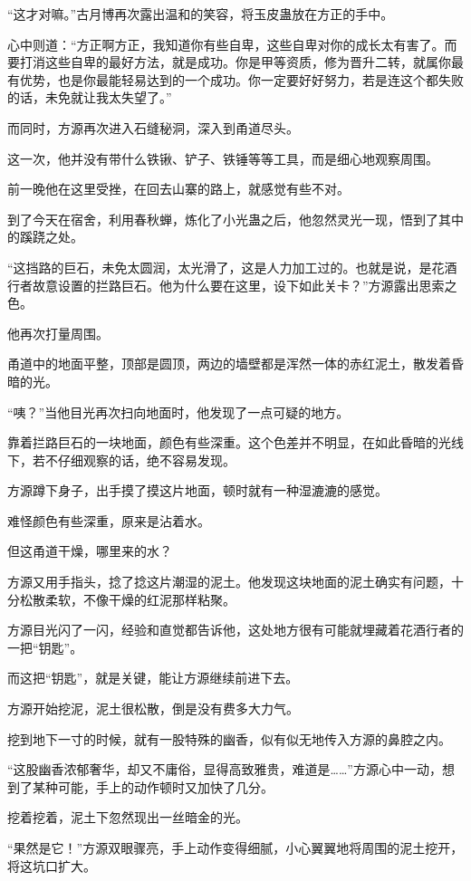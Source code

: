 \begin{this_body}
“这才对嘛。”古月博再次露出温和的笑容，将玉皮蛊放在方正的手中。

心中则道：“方正啊方正，我知道你有些自卑，这些自卑对你的成长太有害了。而要打消这些自卑的最好方法，就是成功。你是甲等资质，修为晋升二转，就属你最有优势，也是你最能轻易达到的一个成功。你一定要好好努力，若是连这个都失败的话，未免就让我太失望了。”

而同时，方源再次进入石缝秘洞，深入到甬道尽头。

这一次，他并没有带什么铁锹、铲子、铁锤等等工具，而是细心地观察周围。

前一晚他在这里受挫，在回去山寨的路上，就感觉有些不对。

到了今天在宿舍，利用春秋蝉，炼化了小光蛊之后，他忽然灵光一现，悟到了其中的蹊跷之处。

“这挡路的巨石，未免太圆润，太光滑了，这是人力加工过的。也就是说，是花酒行者故意设置的拦路巨石。他为什么要在这里，设下如此关卡？”方源露出思索之色。

他再次打量周围。

甬道中的地面平整，顶部是圆顶，两边的墙壁都是浑然一体的赤红泥土，散发着昏暗的光。

“咦？”当他目光再次扫向地面时，他发现了一点可疑的地方。

靠着拦路巨石的一块地面，颜色有些深重。这个色差并不明显，在如此昏暗的光线下，若不仔细观察的话，绝不容易发现。

方源蹲下身子，出手摸了摸这片地面，顿时就有一种湿漉漉的感觉。

难怪颜色有些深重，原来是沾着水。

但这甬道干燥，哪里来的水？

方源又用手指头，捻了捻这片潮湿的泥土。他发现这块地面的泥土确实有问题，十分松散柔软，不像干燥的红泥那样粘聚。

方源目光闪了一闪，经验和直觉都告诉他，这处地方很有可能就埋藏着花酒行者的一把“钥匙”。

而这把“钥匙”，就是关键，能让方源继续前进下去。

方源开始挖泥，泥土很松散，倒是没有费多大力气。

挖到地下一寸的时候，就有一股特殊的幽香，似有似无地传入方源的鼻腔之内。

“这股幽香浓郁奢华，却又不庸俗，显得高致雅贵，难道是……”方源心中一动，想到了某种可能，手上的动作顿时又加快了几分。

挖着挖着，泥土下忽然现出一丝暗金的光。

“果然是它！”方源双眼骤亮，手上动作变得细腻，小心翼翼地将周围的泥土挖开，将这坑口扩大。


\end{this_body}
